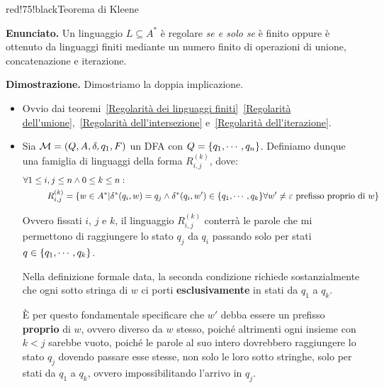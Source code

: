\begin{halfframedbox}{red!75!black}{Teorema di Kleene}\label{Teorema di Kleene}

  \textbf{Enunciato.} Un linguaggio \(L \subseteq A^*\) è regolare \textit{se e solo se} è finito oppure è ottenuto da linguaggi finiti mediante un numero finito di operazioni di unione, concatenazione e iterazione.

  \begin{center}
    \textcolor{red!75!black}{\hdashrule[0.5ex]{18cm}{1pt}{3mm 3pt 1mm 2pt}}
  \end{center}

  \textbf{Dimostrazione.} Dimostriamo la doppia implicazione.

  \begin{itemize}
    \item [``\(\Rightarrow\)''] Ovvio dai teoremi~\ref{Regolarità dei linguaggi finiti}~\ref{Regolarità dell'unione},~\ref{Regolarità dell'intersezione} e~\ref{Regolarità dell'iterazione}.
    \item [``\(\Leftarrow\)''] Sia \(\mathcal{M}=(Q,A,\delta,q_1,F)\) un DFA con \(Q=\displaystyle{\left\{{q_1,\cdots,q_n}\right\}}\). Definiamo dunque una famiglia di linguaggi della forma \(R^{(k)}_{i,j}\), dove:
    \begin{equation}
      \begin{split}
        \forall 1 \leq i&, j \leq n \land 0 \leq k \leq n:\\
        &R^{(k)}_{i,j}=\displaystyle{\left\{{w \in A^* \vert \delta^*(q_i,w)=q_j \land \delta^*(q_i,w') \in \displaystyle{\left\{{q_1,\cdots,q_k}\right\}} \forall w'\neq \varepsilon \text{ prefisso proprio di } w }\right\}}
      \end{split}
    \end{equation}

    Ovvero fissati \(i\), \(j\) e \(k\), il linguaggio \(R^{(k)}_{i,j}\) conterrà le parole che mi permettono di raggiungere lo stato \(q_j\) da \(q_i\) passando solo per stati \(q \in \displaystyle{\left\{{q_1,\cdots,q_k}\right\}}\).

    Nella definizione formale data, la seconda condizione richiede sostanzialmente che ogni sotto stringa di \(w\) ci porti \textbf{esclusivamente} in stati da \(q_1\) a \(q_k\).

    È per questo fondamentale specificare che \(w'\) debba essere un prefisso \textbf{proprio} di \(w\), ovvero diverso da \(w\) stesso, poiché altrimenti ogni insieme con \(k<j\) sarebbe vuoto, poiché le parole al suo intero dovrebbero raggiungere lo stato \(q_j\) dovendo passare esse stesse, non solo le loro sotto stringhe, solo per stati da \(q_1\) a \(q_k\), ovvero impossibilitando l'arrivo in \(q_j\).


\end{itemize}
\end{halfframedbox}

